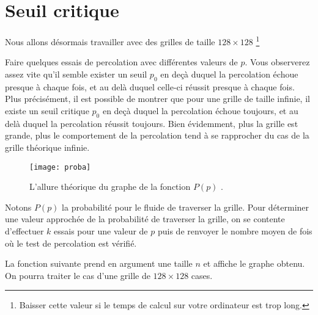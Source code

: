 \newpage
%
\section{Seuil critique}\label{seuil-critique}
%
Nous allons désormais travailler avec des grilles de taille $128\times 128$ \footnote{Baisser cette valeur si le temps de calcul sur votre ordinateur est trop long.}


Faire quelques essais de percolation avec différentes valeurs de $p$. Vous observerez assez vite qu'il semble exister un seuil $p_0$ en deçà duquel la percolation
échoue presque à chaque fois, et au delà duquel celle-ci réussit presque
à chaque fois. Plus précisément, il est possible de montrer que pour une
grille de taille infinie, il existe un seuil critique
$p_0$ en deçà duquel la percolation échoue toujours,
et au delà duquel la percolation réussit toujours. Bien évidemment, plus
la grille est grande, plus le comportement de la percolation tend à se
rapprocher du cas de la grille théorique infinie.
\begin{figure}[H]
\centering
\texttt{[image: proba]}
\caption{L'allure théorique du graphe de la fonction $P(p)$ \label{fig3}.}
\end{figure}


Notons $P(p)$ la probabilité pour le fluide de traverser la grille. Pour déterminer une valeur approchée de la probabilité de traverser la grille, on se contente d'effectuer $k$ essais pour une valeur de $p$ puis de renvoyer le nombre moyen de fois où le test de percolation est vérifié.\\





La fonction suivante prend en argument une taille $n$ et affiche le graphe obtenu. On pourra traiter le 
cas d'une grille de $128\times 128$ cases.%

